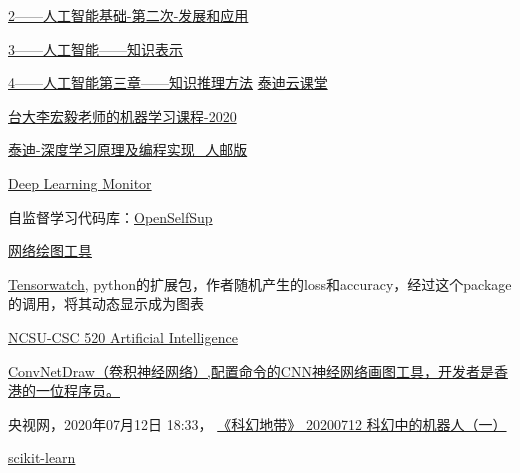 \begin{pre}
\href{https://ke.qq.com/webcourse/index.html?cid=1086628&term_id=101182654&lite=1&from=800021724#taid=8423279&vid=5285890799803709554}{2——人工智能基础-第二次-发展和应用}

\href{https://github.com/zggl/AITeachingPlanDraft2020/blob/master/3-\%E4\%BA\%BA\%E5\%B7\%A5\%E6\%99\%BA\%E8\%83\%BD\%E7\%AC\%AC\%E4\%BA\%8C\%E7\%AB\%A0\%E7\%AC\%AC\%E4\%B8\%80\%E6\%AC\%A1\%E5\%B9\%BB\%E7\%81\%AF\%20\%E4\%BA\%BA\%E5\%B7\%A5\%E6\%99\%BA\%E8\%83\%BD\%E7\%9A\%84\%E7\%9F\%A5\%E8\%AF\%86\%E8\%A1\%A8\%E7\%A4\%BA.pdf}{3——人工智能——知识表示}

\href{https://github.com/zggl/AITeachingPlanDraft2020/blob/master/4-\%E4\%BA\%BA\%E5\%B7\%A5\%E6\%99\%BA\%E8\%83\%BD\%E7\%AC\%AC\%E4\%B8\%89\%E7\%AB\%A0\%E7\%AC\%AC\%E4\%B8\%80\%E6\%AC\%A1\%20\%E4\%BA\%BA\%E5\%B7\%A5\%E6\%99\%BA\%E8\%83\%BD\%E7\%9A\%84\%E7\%9F\%A5\%E8\%AF\%86\%E6\%8E\%A8\%E7\%90\%86\%E6\%96\%B9\%E6\%B3\%95.pdf}{4——人工智能第三章——知识推理方法}
\href{https://edu.tipdm.org/notification?id=32302}{泰迪云课堂}

\href{http://speech.ee.ntu.edu.tw/~tlkagk/courses_ML20.html}{台大李宏毅老师的机器学习课程-2020}

\href{https://edu.tipdm.org/classroom/122/courses}{泰迪-深度学习原理及编程实现\_人邮版}

\href{https://deeplearn.org/}{Deep Learning Monitor}

自监督学习代码库：\href{https://github.com/open-mmlab/OpenSelfSup}{OpenSelfSup}

\href{http://alexlenail.me/NN-SVG/}{网络绘图工具}

\href{https://github.com/microsoft/tensorwatch}{Tensorwatch}, python的扩展包，作者随机产生的loss和accuracy，经过这个package的调用，将其动态显示成为图表

\href{https://www.engineeringonline.ncsu.edu/course/csc-520-artificial-intelligence-i/}{NCSU-CSC 520 Artificial Intelligence}

\href{https://cbovar.github.io/ConvNetDraw/}{ConvNetDraw（卷积神经网络）,配置命令的CNN神经网络画图工具，开发者是香港的一位程序员。}

央视网，2020年07月12日 18:33， \href{https://tv.cctv.com/2020/07/12/VIDE97wmdEMDFTuh2C9XaSOL200712.shtml?spm=C53121759377.Pxm23GSMKB13.0.0}{《科幻地带》 20200712 科幻中的机器人（一）}

\href{https://scikit-learn.org/stable/about.html#citing-scikit-learn}{scikit-learn}


\end{pre}
